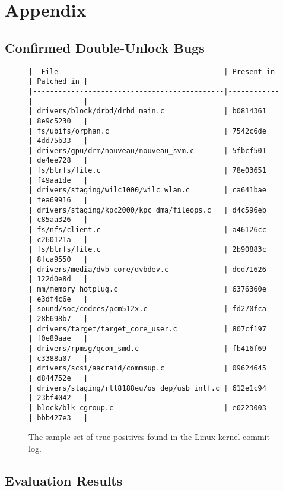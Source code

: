 \section{Appendix}
\subsection{Confirmed Double-Unlock Bugs}

\begin{figure}[H]
\begin{verbatim}
|  File                                       | Present in | Patched in |
|---------------------------------------------|------------|------------|
| drivers/block/drbd/drbd_main.c              | b0814361   | 8e9c5230   |
| fs/ubifs/orphan.c                           | 7542c6de   | 4dd75b33   | 
| drivers/gpu/drm/nouveau/nouveau_svm.c       | 5fbcf501   | de4ee728   |
| fs/btrfs/file.c                             | 78e03651   | f49aa1de   |
| drivers/staging/wilc1000/wilc_wlan.c        | ca641bae   | fea69916   |
| drivers/staging/kpc2000/kpc_dma/fileops.c   | d4c596eb   | c85aa326   |
| fs/nfs/client.c                             | a46126cc   | c260121a   |
| fs/btrfs/file.c                             | 2b90883c   | 8fca9550   |
| drivers/media/dvb-core/dvbdev.c             | ded71626   | 122d0e8d   |
| mm/memory_hotplug.c                         | 6376360e   | e3df4c6e   |
| sound/soc/codecs/pcm512x.c                  | fd270fca   | 28b698b7   |
| drivers/target/target_core_user.c           | 807cf197   | f0e89aae   |
| drivers/rpmsg/qcom_smd.c                    | fb416f69   | c3388a07   |
| drivers/scsi/aacraid/commsup.c              | 09624645   | d844752e   |
| drivers/staging/rtl8188eu/os_dep/usb_intf.c | 612e1c94   | 23bf4042   |
| block/blk-cgroup.c                          | e0223003   | bbb427e3   |
\end{verbatim}
\caption{The sample set of true positives found in the Linux kernel commit log.}
\label{truepositives}
\end{figure}

\subsection{Evaluation Results}

